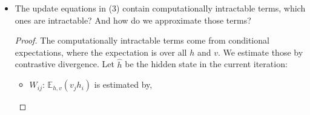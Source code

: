 \documentclass[12pt]{article}
\newcommand{\E}{\mathbb{E}}
\newcommand{\1}{\mathbf{1}}
\begin{document}
{\begin{itemize}
\begin{proof}
      \begin{align*}
        \frac{\partial F(v; \theta)}{\partial W_{ij}} &= -\sum_{i=1}^n \frac{1}{1 + e^{v^T W_i + c_i }} \frac{\partial e^{v^T W_i + c_i }}{\partial W_{ij}} = - \frac{1}{1 + e^{ - (v^T W_i + c_i)}}v_j \\
        &= - v_j sigmoid(v^T W_i + c_i). \\
        \frac{\partial F(v; \theta)}{\partial b_j} &= -v_j \\
        \frac{\partial F(v; \theta)}{\partial c_i} &= --\sum_{i=1}^n \frac{1}{1 + e^{v^T W_i + c_i }} \frac{\partial e^{v^T W_i + c_i }}{\partial c_i} = - \frac{1}{1 + e^{ - (v^T W_i + c_i)}}v_j \\
        &= -sigmoid(v^{\rm T} W_i + c_i).
      \end{align*}
      Thus assembling those together will give,
      \begin{align*}
        \frac{\partial \mathcal{L}(D|\theta)}{\partial W_{ij}} &= \sum_{t=1}^N \left(v_j^{(t)} sigmoid((v^{(t)})^{\rm T}W_i + c_i)  - \E_{v} \left( v_j sigmoid(v^{\rm T} W_i + c_j)\right)\right)  \\
        &= \sum_{t=1}^N \left( v_j^{(t)} sigmoid((v^{(t)})^{\rm T}W_i + c_i)\right)  - N\E_{v, h}(v_j h_i) \\
        \frac{\partial \mathcal{L}(D|\theta)}{\partial b_j} &= \sum_{t=1}^N \left(v_j^{(t)} - \E_v (v_j)\right) \\
        &= \sum_{t=1}^N v_j^{(t)}  - N \E_{v, h}(v_j)) \\
        \frac{\partial \mathcal{L}(D|\theta)}{c_i} &= \sum_{t=1}^N \left( sigmoid((v^{(t)})^{\rm T} W_i + c_i) - \E_v(sigmoid(v^{\rm T} W_i + c_i)) \right) \\
        &= \sum_{t=1}^N \left( sigmoid((v^{(t)})^{\rm T} W_i + c_i)  \right)- N\E_{v, h}(h_i)
      \end{align*}
    \end{proof}
    \item The update equations in (3) contain computationally intractable terms, which ones are intractable? And how do we approximate those terms?
    \begin{proof}
      The computationally intractable terms come from conditional expectations, where the expectation is over all $h$ and $v$. We estimate those by contrastive divergence. Let $\hat{h}$ be the hidden state in the current iteration: 
      \begin{itemize}
        \item $W_{ij}$: $\E_{h,v}(v_jh_i)$ is estimated by,

\end{itemize}
\end{proof}
\end{itemize}}
\end{document}
